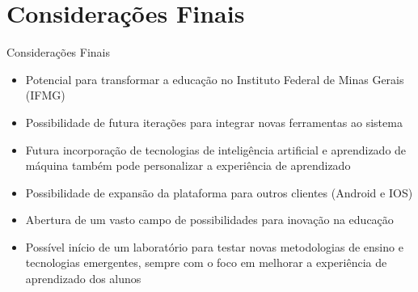 \AtBeginSection[]{
	\begin{frame}
		\frametitle{}
		\tableofcontents[currentsection]
	\end{frame}
}

\section{Considerações Finais}
\begin{frame}{Considerações Finais}
	\begin{itemize}[<+->]
		\item Potencial para transformar a educação no Instituto Federal de Minas Gerais (IFMG)
		\item Possibilidade de futura iterações para integrar novas ferramentas ao sistema
		\item Futura incorporação de tecnologias de inteligência artificial e aprendizado de máquina 
		também pode personalizar a experiência de aprendizado
		\item Possibilidade de expansão da plataforma para outros clientes (Android e IOS)
		\item Abertura de um vasto campo de possibilidades para inovação na educação
		\item Possível início de um laboratório para testar novas metodologias de ensino e tecnologias 
		emergentes, sempre com o foco em melhorar a experiência de aprendizado dos alunos
	\end{itemize}
\end{frame}